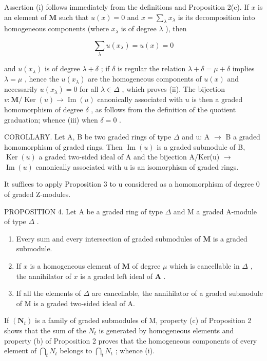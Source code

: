 Assertion (i) follows immediately from the definitions and Proposition 2(c). If \(x\) is an element of \(\mathbf{M}\) such that \(u(x) = 0\) and \(x = \sum_{\lambda} x_{\lambda}\) is its decomposition into homogeneous components (where \(x_{\lambda}\) is of degree \(\lambda\) ), then

\[
\sum_ {\lambda} u (x _ {\lambda}) = u (x) = 0
\]

and \(u(x_{\lambda})\) is of degree \(\lambda + \delta\) ; if \(\delta\) is regular the relation \(\lambda + \delta = \mu + \delta\) implies \(\lambda = \mu\) , hence the \(u(x_{\lambda})\) are the homogeneous components of \(u(x)\) and necessarily \(u(x_{\lambda}) = 0\) for all \(\lambda \in \Delta\) , which proves (ii). The bijection \(v: \mathbf{M} / \operatorname{Ker}(u) \to \operatorname{Im}(u)\) canonically associated with \(u\) is then a graded homomorphism of degree \(\delta\) , as follows from the definition of the quotient graduation; whence (iii) when \(\delta = 0\) .

COROLLARY. Let A, B be two graded rings of type \(\Delta\) and u: A \(\rightarrow\) B a graded homomorphism of graded rings. Then \(\operatorname{Im}(u)\) is a graded submodule of B, \(\operatorname{Ker}(u)\) a graded two-sided ideal of A and the bijection A/Ker(u) \(\rightarrow\) \(\operatorname{Im}(u)\) canonically associated with u is an isomorphism of graded rings.

It suffices to apply Proposition 3 to u considered as a homomorphism of degree 0 of graded Z-modules.

PROPOSITION 4. Let A be a graded ring of type \(\Delta\) and M a graded A-module of type \(\Delta\) .

\begin{enumerate}
\def\labelenumi{(\roman{enumi})}
\item
  Every sum and every intersection of graded submodules of \(\mathbf{M}\) is a graded submodule.
\item
  If \(x\) is a homogeneous element of \(\mathbf{M}\) of degree \(\mu\) which is cancellable in \(\Delta\) , the annihilator of \(x\) is a graded left ideal of \(\mathbf{A}\) .
\item
  If all the elements of \(\Delta\) are cancellable, the annihilator of a graded submodule of M is a graded two-sided ideal of A.
\end{enumerate}

If \((\mathbf{N}_{t})\) is a family of graded submodules of M, property (c) of Proposition 2 shows that the sum of the \(N_{t}\) is generated by homogeneous elements and property (b) of Proposition 2 proves that the homogeneous components of every element of \(\bigcap_{t} N_{t}\) belongs to \(\bigcap_{t} N_{t}\) ; whence (i).

